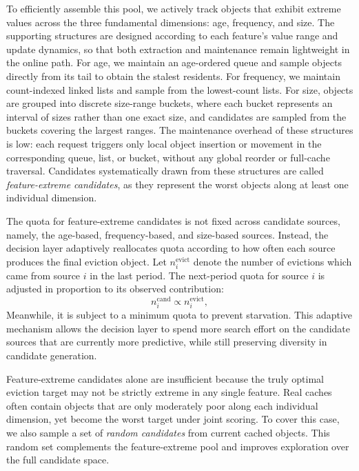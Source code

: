 \documentclass[10pt,journal]{IEEEtran}
\theoremstyle{slantedlemma}
\begin{document}
To efficiently assemble this pool, we actively track objects that exhibit extreme values across the three fundamental dimensions: age, frequency, and size. The supporting structures are designed according to each feature's value range and update dynamics, so that both extraction and maintenance remain lightweight in the online path. For age, we maintain an age-ordered queue and sample objects directly from its tail to obtain the stalest residents. For frequency, we maintain count-indexed linked lists and sample from the lowest-count lists. For size, objects are grouped into discrete size-range buckets, where each bucket represents an interval of sizes rather than one exact size, and candidates are sampled from the buckets covering the largest ranges. The maintenance overhead of these structures is low: each request triggers only local object insertion or movement in the corresponding queue, list, or bucket, without any global reorder or full-cache traversal. Candidates systematically drawn from these structures are called \emph{feature-extreme candidates}, as they represent the worst objects along at least one individual dimension.

The quota for feature-extreme candidates is not fixed across candidate sources, namely, the age-based, frequency-based, and size-based sources. Instead, the decision layer adaptively reallocates quota according to how often each source produces the final eviction object. Let $n_i^{\mathrm{evict}}$ denote the number of evictions which came from source $i$ in the last period. The next-period quota for source $i$ is adjusted in proportion to its observed contribution:
\begin{equation}
n_i^{\mathrm{cand}} \propto n_i^{\mathrm{evict}},
\label{eq:adaptive-budget}
\end{equation}
Meanwhile, it is subject to a minimum quota to prevent starvation. This adaptive mechanism allows the decision layer to spend more search effort on the candidate sources that are currently more predictive, while still preserving diversity in candidate generation.

Feature-extreme candidates alone are insufficient because the truly optimal eviction target may not be strictly extreme in any single feature. Real caches often contain objects that are only moderately poor along each individual dimension, yet become the worst target under joint scoring. To cover this case, we also sample a set of \emph{random candidates} from current cached objects. This random set complements the feature-extreme pool and improves exploration over the full candidate space.
\end{document}
